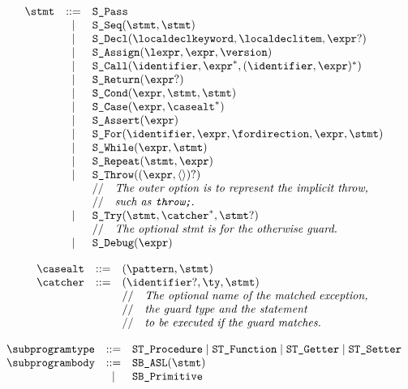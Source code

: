 \documentclass{book}
\begin{document}
\[
\begin{array}{rcl}
\stmt &::=& \texttt{S\_Pass}\\
  &|& \texttt{S\_Seq}(\stmt, \stmt)\\
  &|& \texttt{S\_Decl}(\localdeclkeyword, \localdeclitem, \expr?)\\
  &|& \texttt{S\_Assign}(\lexpr, \expr, \version)\\
  &|& \texttt{S\_Call}(\identifier, \expr^*, (\identifier, \expr)^*)\\
  &|& \texttt{S\_Return}(\expr?)\\
  &|& \texttt{S\_Cond}(\expr, \stmt, \stmt)\\
  &|& \texttt{S\_Case}(\expr, \casealt^*)\\
  &|& \texttt{S\_Assert}(\expr)\\
  &|& \texttt{S\_For}(\identifier, \expr, \fordirection, \expr, \stmt)\\
  &|& \texttt{S\_While}(\expr, \stmt)\\
  &|& \texttt{S\_Repeat}(\stmt, \expr)\\
  &|& \texttt{S\_Throw}((\expr, \langle\rangle)?)\\
  & & \ASTComment{The outer option is to represent the implicit throw,}\\
  & & \ASTComment{such as \texttt{throw;}.}\\
  &|& \texttt{S\_Try}(\stmt, \catcher^*, \stmt?)\\
  & & \ASTComment{The optional stmt is for the otherwise guard.}\\
  &|& \texttt{S\_Debug}(\expr)
\end{array}
\]

\[
\begin{array}{rcl}
\casealt &::=& (\pattern, \stmt)\\
\catcher &::=& (\identifier?, \ty, \stmt)\\
  & & \ASTComment{The optional name of the matched exception,}\\
  & & \ASTComment{the guard type and the statement}\\
  & & \ASTComment{to be executed if the guard matches.}\\
\end{array}
\]

\[
\begin{array}{rcl}
\subprogramtype &::=& \texttt{ST\_Procedure} \;|\; \texttt{ST\_Function} \;|\; \texttt{ST\_Getter} \;|\; \texttt{ST\_Setter}\\
\subprogrambody &::=& \texttt{SB\_ASL}(\stmt)\\
  &|& \texttt{SB\_Primitive}\\
\end{array}
\]
\end{document}
